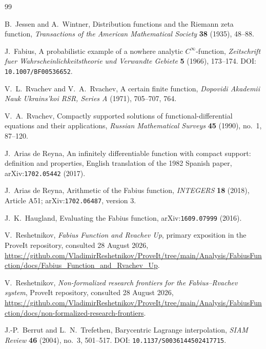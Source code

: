 \documentclass[11pt,oneside]{article}
\theoremstyle{definition}
\theoremstyle{remark}
\begin{document}
\begin{thebibliography}{99}

B.~Jessen and A.~Wintner,
\newblock Distribution functions and the Riemann zeta function,
\newblock \emph{Transactions of the American Mathematical Society} \textbf{38} (1935), 48--88.

J.~Fabius,
\newblock A probabilistic example of a nowhere analytic $C^\infty$-function,
\newblock \emph{Zeitschrift fuer Wahrscheinlichkeitstheorie und Verwandte Gebiete} \textbf{5} (1966), 173--174.
\newblock DOI: \nolinkurl{10.1007/BF00536652}.

V.~L.~Rvachev and V.~A.~Rvachev,
\newblock A certain finite function,
\newblock \emph{Dopovidi Akademii Nauk Ukrains'koi RSR, Series A} (1971), 705--707, 764.

V.~A.~Rvachev,
\newblock Compactly supported solutions of functional-differential equations and their applications,
\newblock \emph{Russian Mathematical Surveys} \textbf{45} (1990), no.~1, 87--120.

J.~Arias de Reyna,
\newblock An infinitely differentiable function with compact support: definition and properties,
\newblock English translation of the 1982 Spanish paper, arXiv:\nolinkurl{1702.05442} (2017).

J.~Arias de Reyna,
\newblock Arithmetic of the Fabius function,
\newblock \emph{INTEGERS} \textbf{18} (2018), Article A51; arXiv:\nolinkurl{1702.06487}, version 3.

J.~K.~Haugland,
\newblock Evaluating the Fabius function,
\newblock arXiv:\nolinkurl{1609.07999} (2016).

V.~Reshetnikov,
\newblock \emph{Fabius Function and Rvachev Up}, primary exposition in the ProveIt repository,
\newblock consulted 28 August 2026,
\newblock \url{https://github.com/VladimirReshetnikov/ProveIt/tree/main/Analysis/FabiusFunction/docs/Fabius_Function_and_Rvachev_Up}.

V.~Reshetnikov,
\newblock \emph{Non-formalized research frontiers for the Fabius--Rvachev system},
\newblock ProveIt repository, consulted 28 August 2026,
\newblock \url{https://github.com/VladimirReshetnikov/ProveIt/tree/main/Analysis/FabiusFunction/docs/non-formalized-research-frontiers}.

J.-P.~Berrut and L.~N.~Trefethen,
\newblock Barycentric Lagrange interpolation,
\newblock \emph{SIAM Review} \textbf{46} (2004), no.~3, 501--517.
\newblock DOI: \nolinkurl{10.1137/S0036144502417715}.


\end{thebibliography}
\end{document}
